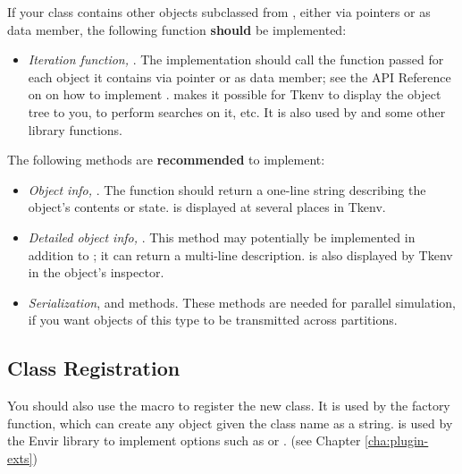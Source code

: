 If your class contains other objects subclassed from ,
either via pointers or as data member, the following function \textbf{should}
be implemented:

\begin{itemize}
  \item{\textit{Iteration function,} .
        The implementation should call the function passed
        for each object it contains via pointer or as data member;
        see the API Reference on  on how to implement
        .  makes it possible
        for Tkenv to display the object tree to you, to perform searches on it, etc.
        It is also used by  and some other library functions.}
\end{itemize}

The following methods are \textbf{recommended} to implement:

\begin{itemize}
  \item{\textit{Object info,} . The  function
        should return a one-line string describing the object's contents or state.
         is displayed at several places in Tkenv.}
  \item{\textit{Detailed object info,} .
        This method may potentially be implemented in addition to ;
        it can return a multi-line description.  is also
        displayed by Tkenv in the object's inspector.}
  \item{\textit{Serialization},  and  methods.
        These methods are needed for parallel simulation, if you want
        objects of this type to be transmitted across partitions.}
\end{itemize}


\subsection{Class Registration}

You should also use the  macro to register the
new class. It is used by the  factory function, which can
create any object given the class name as a string. 
is used by the Envir library to implement  options
such as  or .
(see Chapter \ref{cha:plugin-exts})

